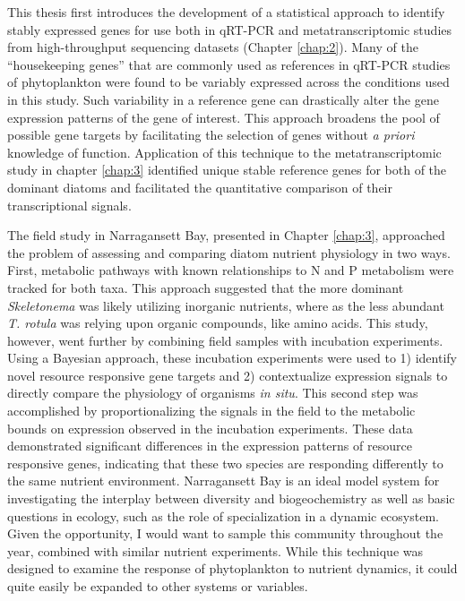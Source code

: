 \par
This thesis first introduces the development of a statistical approach to identify stably expressed genes for use both in qRT-PCR and metatranscriptomic studies from high-throughput sequencing datasets (Chapter \ref{chap:2}). Many of the ``housekeeping genes'' that are commonly used as references in qRT-PCR studies of phytoplankton were found to be variably expressed across the conditions used in this study. Such variability in a reference gene can drastically alter the gene expression patterns of the gene of interest. This approach broadens the pool of possible gene targets by facilitating the selection of genes without \textit{a priori} knowledge of function. Application of this technique to the metatranscriptomic study in chapter \ref{chap:3} identified unique stable reference genes for both of the dominant diatoms and facilitated the quantitative comparison of their transcriptional signals. 
\par
The field study in Narragansett Bay, presented in Chapter \ref{chap:3}, approached the problem of assessing and comparing diatom nutrient physiology in two ways. First, metabolic pathways with known relationships to N and P metabolism were tracked for both taxa. This approach suggested that the more dominant \textit{Skeletonema} was likely utilizing inorganic nutrients, where as the less abundant \textit{T. rotula} was relying upon organic compounds, like amino acids. This study, however, went further by combining field samples with incubation experiments. Using a Bayesian approach, these incubation experiments were used to 1) identify novel resource responsive gene targets and 2) contextualize expression signals to directly compare the physiology of organisms \textit{in situ}. This second step was accomplished by proportionalizing the signals in the field to the metabolic bounds on expression observed in the incubation experiments. These data demonstrated significant differences in the expression patterns of resource responsive genes, indicating that these two species are responding differently to the same nutrient environment. Narragansett Bay is an ideal model system for investigating the interplay between diversity and biogeochemistry as well as basic questions in ecology, such as the role of specialization in a dynamic ecosystem. Given the opportunity, I would want to sample this community throughout the year, combined with similar nutrient experiments. While this technique was designed to examine the response of phytoplankton to nutrient dynamics, it could quite easily be expanded to other systems or variables. 
